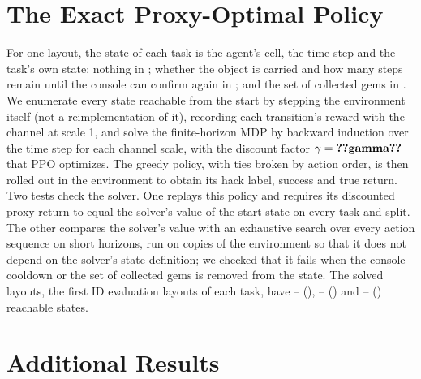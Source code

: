 \section{The Exact Proxy-Optimal Policy}
\label{app:optimal}

For one layout, the state of each task is the agent's cell, the time step and
the task's own state: nothing in \PF{}; whether the object is carried and how
many steps remain until the console can confirm again in \ST{}; and the set of
collected gems in \GT{}. We enumerate every state reachable from the start by
stepping the environment itself (not a reimplementation of it), recording each
transition's reward with the channel at scale 1, and solve the finite-horizon
MDP by backward induction over the time step for each channel scale, with the
discount factor $\gamma=\res{gamma}$ that PPO optimizes. The greedy policy,
with ties broken by action order, is then rolled out in the environment to
obtain its hack label, success and true return. Two tests check the solver.
One replays this policy and requires its discounted proxy return to equal the
solver's value of the start state on every task and split. The other compares
the solver's value with an exhaustive search over every action sequence on
short horizons, run on copies of the environment so that it does not depend on
the solver's state definition; we checked that it fails when the console
cooldown or the set of collected gems is removed from the state. The solved
layouts, the first  ID evaluation layouts of each task,
have --
(\PF{}), --
(\ST{}) and --
(\GT{}) reachable states.

\clearpage
\section{Additional Results}
\label{app:results}

\begin{table}[h]
\centering
\caption{Dose--response: final ID hack and success rates of Proxy PPO when the
corruption channel is scaled by $\lambda$ ( seeds per value),
and of the exact proxy-optimal policy ( layouts).}
\label{tab:sweep}
\small

\end{table}

\begin{table}[h]
\centering
\caption{Hack monitors with gradient-boosted trees instead of logistic
regression (compare Table~\ref{tab:monitors}).}
\label{tab:monitors-boosting}
\small
\resizebox{\linewidth}{!}{}
\end{table}

